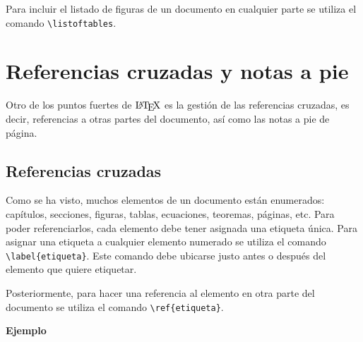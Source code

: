 \documentclass[
  a4paper,
]{scrreport}
\begin{document}
Para incluir el listado de figuras de un documento en cualquier parte se
utiliza el comando \texttt{\textbackslash{}listoftables}.


\hypertarget{referencias-cruzadas-y-notas-a-pie}{%
\chapter{Referencias cruzadas y notas a
pie}\label{referencias-cruzadas-y-notas-a-pie}}

Otro de los puntos fuertes de \(\text{\LaTeX}\) es la gestión de las
referencias cruzadas, es decir, referencias a otras partes del
documento, así como las notas a pie de página.

\hypertarget{referencias-cruzadas}{%
\section{Referencias cruzadas}\label{referencias-cruzadas}}

Como se ha visto, muchos elementos de un documento están enumerados:
capítulos, secciones, figuras, tablas, ecuaciones, teoremas, páginas,
etc. Para poder referenciarlos, cada elemento debe tener asignada una
etiqueta única. Para asignar una etiqueta a cualquier elemento numerado
se utiliza el comando \texttt{\textbackslash{}label\{etiqueta\}}. Este
comando debe ubicarse justo antes o después del elemento que quiere
etiquetar.

Posteriormente, para hacer una referencia al elemento en otra parte del
documento se utiliza el comando
\texttt{\textbackslash{}ref\{etiqueta\}}.

\textbf{Ejemplo}
\end{document}
